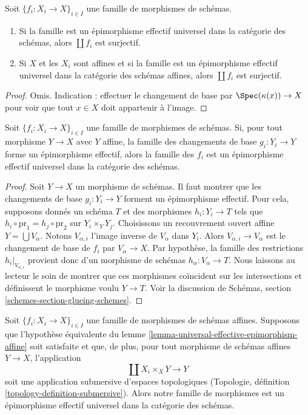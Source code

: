 \begin{lemma}
\label{lemma-universal-effective-epimorphism-surjective}
Soit $\{f_i : X_i \to X\}_{i \in I}$ une famille de morphismes de schémas.
\begin{enumerate}
\item Si la famille est un épimorphisme effectif universel dans la catégorie
des schémas, alors $\coprod f_i$ est surjectif.
\item Si $X$ et les $X_i$ sont affines et si la famille est un épimorphisme
effectif universel dans la catégorie des schémas affines, alors
$\coprod f_i$ est surjectif.
\end{enumerate}
\end{lemma}

\begin{proof}
Omis. Indication : effectuer le changement de base par
$\Spec(\kappa(x)) \to X$ pour voir que tout $x \in X$ doit appartenir à
l'image.
\end{proof}

\begin{lemma}
\label{lemma-check-universal-effective-epimorphism-affine}
Soit $\{f_i : X_i \to X\}_{i \in I}$ une famille de morphismes de schémas.
Si, pour tout morphisme $Y \to X$ avec $Y$ affine, la famille des changements
de base $g_i : Y_i \to Y$ forme un épimorphisme effectif, alors la famille des
$f_i$ est un épimorphisme effectif universel dans la catégorie des schémas.
\end{lemma}

\begin{proof}
Soit $Y \to X$ un morphisme de schémas. Il faut montrer que les changements
de base $g_i : Y_i \to Y$ forment un épimorphisme effectif.
Pour cela, supposons donnés un schéma $T$ et des morphismes $h_i : Y_i \to T$
tels que $h_i \circ \text{pr}_1 = h_j \circ \text{pr}_2$ sur
$Y_i \times_Y Y_j$.
Choisissons un recouvrement ouvert affine $Y = \bigcup V_\alpha$.
Notons $V_{\alpha, i}$ l'image inverse de $V_\alpha$ dans $Y_i$.
Alors $V_{\alpha, i}  \to V_\alpha$ est le changement de base de $f_i$ par
$V_\alpha \to X$. Par hypothèse, la famille des restrictions
$h_i|_{V_{\alpha, i}}$ provient donc d'un morphisme de schémas
$h_\alpha : V_\alpha \to T$.
Nous laissons au lecteur le soin de montrer que ces morphismes coïncident sur
les intersections et définissent le morphisme voulu $Y \to T$.
Voir la discussion de Schémas, section
\ref{schemes-section-glueing-schemes}.
\end{proof}

\begin{lemma}
\label{lemma-universal-effective-epimorphism}
Soit $\{f_i : X_i \to X\}_{i \in I}$ une famille de morphismes de schémas
affines. Supposons que l'hypothèse équivalente du lemme
\ref{lemma-universal-effective-epimorphism-affine} soit satisfaite et que,
de plus, pour tout morphisme de schémas affines $Y \to X$, l'application
$$
\coprod X_i \times_X Y \longrightarrow Y
$$
soit une application submersive d'espaces topologiques
(Topologie, définition \ref{topology-definition-submersive}).
Alors notre famille de morphismes est un épimorphisme effectif universel dans
la catégorie des schémas.
\end{lemma}


